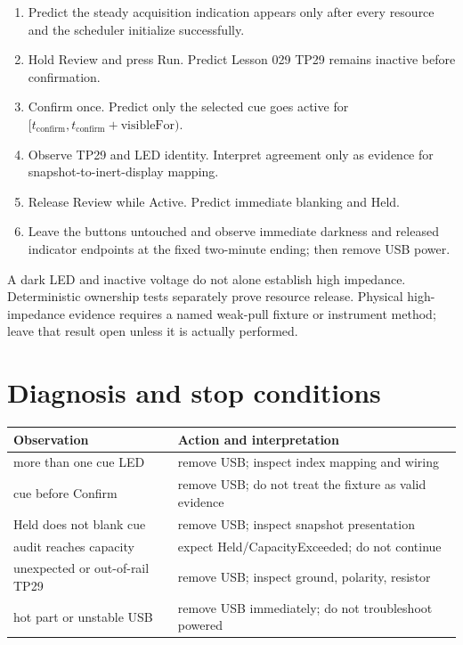 \documentclass[11pt]{article}
\begin{document}
\begin{enumerate}
  \item Predict the steady acquisition indication appears only after every
        resource and the scheduler initialize successfully.
  \item Hold Review and press Run. Predict Lesson 029 TP29 remains inactive
        before confirmation.
  \item Confirm once. Predict only the selected cue goes active for
        \([t_{\mathrm{confirm}},t_{\mathrm{confirm}}+\mathrm{visibleFor})\).
  \item Observe TP29 and LED identity. Interpret agreement only as evidence for
        snapshot-to-inert-display mapping.
  \item Release Review while Active. Predict immediate blanking and Held.
  \item Leave the buttons untouched and observe immediate darkness and
        released indicator endpoints at the fixed two-minute ending; then
        remove USB power.
\end{enumerate}

A dark LED and inactive voltage do not alone establish high impedance.
Deterministic ownership tests separately prove resource release. Physical
high-impedance evidence requires a named weak-pull fixture or instrument
method; leave that result open unless it is actually performed.

\section{Diagnosis and stop conditions}

\begin{tabularx}{\linewidth}{@{}X X@{}}
\toprule
Observation & Action and interpretation\\
\midrule
more than one cue LED & remove USB; inspect index mapping and wiring\\
cue before Confirm & remove USB; do not treat the fixture as valid evidence\\
Held does not blank cue & remove USB; inspect snapshot presentation\\
audit reaches capacity & expect Held/CapacityExceeded; do not continue\\
unexpected or out-of-rail TP29 & remove USB; inspect ground, polarity, resistor\\
hot part or unstable USB & remove USB immediately; do not troubleshoot powered\\
\bottomrule
\end{tabularx}
\end{document}
